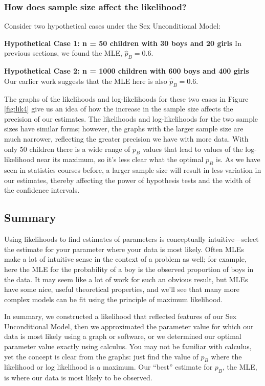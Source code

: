 \documentclass[
]{krantz}
\begin{document}
\subsubsection{How does sample size affect the likelihood?}\label{how-does-sample-size-affect-the-likelihood}

Consider two hypothetical cases under the Sex Unconditional Model:

\textbf{Hypothetical Case 1: n = 50 children with 30 boys and 20 girls} In previous sections, we found the MLE, \(\hat{p}_B=0.6.\)

\textbf{Hypothetical Case 2: n = 1000 children with 600 boys and 400 girls} Our earlier work suggests that the MLE here is also \(\hat{p}_B=0.6.\)

The graphs of the likelihoods and log-likelihoods for these two cases in Figure \ref{fig:lik4} give us an idea of how the increase in the sample size affects the precision of our estimates. The likelihoods and log-likelihoods for the two sample sizes have similar forms; however, the graphs with the larger sample size are much narrower, reflecting the greater precision we have with more data. With only 50 children there is a wide range of \(p_B\) values that lead to values of the log-likelihood near its maximum, so it's less clear what the optimal \(p_B\) is. As we have seen in statistics courses before, a larger sample size will result in less variation in our estimates, thereby affecting the power of hypothesis tests and the width of the confidence intervals.

\subsection{Summary}\label{summary}

Using likelihoods to find estimates of parameters is conceptually intuitive---select the estimate for your parameter where your data is most likely. Often MLEs make a lot of intuitive sense in the context of a problem as well; for example, here the MLE for the probability of a boy is the observed proportion of boys in the data. It may seem like a lot of work for such an obvious result, but MLEs have some nice, useful theoretical properties, and we'll see that many more complex models can be fit using the principle of maximum likelihood.

In summary, we constructed a likelihood that reflected features of our Sex Unconditional Model, then we approximated the parameter value for which our data is most likely using a graph or software, or we determined our optimal parameter value exactly using calculus. You may not be familiar with calculus, yet the concept is clear from the graphs: just find the value of \(p_B\) where the likelihood or log likelihood is a maximum. Our ``best'' estimate for \(p_B\), the MLE, is where our data is most likely to be observed.
\end{document}
